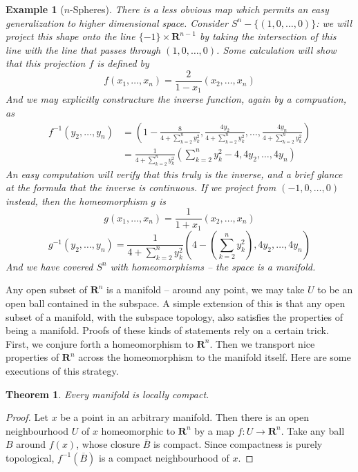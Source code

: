 \documentclass[12pt]{report}
\theoremstyle{plain}
\newtheorem{theorem}{Theorem}[chapter]
\newtheorem*{example}{Example}
\theoremstyle{definition}
\begin{document}
\begin{example}[$n$-Spheres]
    There is a less obvious map which permits an easy generalization to higher dimensional space. Consider $S^n - \{(1,0,\dots,0)\}$: we will project this shape onto the line $\{-1\} \times \mathbf{R}^{n-1}$ by taking the intersection of this line with the line that passes through $(1,0,\dots,0)$. Some calculation will show that this projection $f$ is defined by
    \[ f(x_1, \dots, x_n) = \frac{2}{1 - x_1}(x_2, \dots, x_n) \]
    And we may explicitly constructure the inverse function, again by a compuation, as
    \begin{align*}
        f^{-1}(y_2, \dots, y_n) &= \left(1 - \frac{8}{4 + \sum_{k = 2}^n y_k^2}, \frac{4y_2}{4 + \sum_{k = 2}^n y_k^2}, \dots, \frac{4y_n}{4 + \sum_{k = 2}^n y_k^2} \right)\\
        &= \frac{1}{4 + \sum_{k = 2}^n y_k^2} \left( \sum_{k = 2}^n y_k^2 - 4, 4y_2, \dots, 4y_n \right)
    \end{align*}
%
An easy computation will verify that this truly is the inverse, and a brief glance at the formula that the inverse is continuous. If we project from $(-1,0,\dots,0)$ instead, then the homeomorphism $g$ is
%
\[ g(x_1, \dots, x_n) = \frac{1}{1 + x_1}(x_2, \dots, x_n) \]
%
\[ g^{-1}(y_2, \dots, y_n) = \frac{1}{4 + \sum_{k = 2}^n y_k^2} \left( 4 - \left(\sum_{k = 2}^n y_k^2 \right), 4y_2, \dots, 4y_n \right) \]
%
And we have covered $S^n$ with homeomorphisms -- the space is a manifold.
\end{example}

Any open subset of $\mathbf{R}^n$ is a manifold -- around any point, we may take $U$ to be an open ball contained in the subspace. A simple extension of this is that any open subset of a manifold, with the subspace topology, also satisfies the properties of being a manifold. Proofs of these kinds of statements rely on a certain trick. First, we conjure forth a homeomorphism to $\mathbf{R}^n$. Then we transport nice properties of $\mathbf{R}^n$ across the homeomorphism to the manifold itself. Here are some executions of this strategy.

\begin{theorem}
    Every manifold is locally compact.
\end{theorem}
\begin{proof}
    Let $x$ be a point in an arbitrary manifold. Then there is an open neighbourhood $U$ of $x$ homeomorphic to $\mathbf{R}^n$ by a map $f:U \to \mathbf{R}^n$. Take any ball $B$ around $f(x)$, whose closure $\overline{B}$ is compact. Since compactness is purely topological, $f^{-1}(\overline{B})$ is a compact neighbourhood of $x$.
\end{proof}
\end{document}
